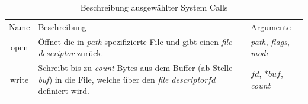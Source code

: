         \begin{table}[ht]
            \small
            \label{tab:syscall}
            \centering
            \begin{tabular}{c||p{6cm}|p{3cm}}
                \hline
                \rowcolor{Gray!36}
                \multicolumn{3}{c}{System Calls}\\
                \hline
                Name & Beschreibung & Argumente \\
                \hline
                \hline
                \rowcolor{Gray!16}
                open& Öffnet die in \textit{path} spezifizierte File und gibt einen \textit{file descriptor} zurück.& \textit{path}, \textit{flags}, \textit{mode} \\
                write& Schreibt bis zu \textit{count} Bytes aus dem Buffer (ab Stelle \textit{buf}) in die File, welche über den \textit{file descriptor}$fd$ definiert wird. & $fd$, $*buf$, \textit{count} \\
                \hline
            \end{tabular}
            \caption{Beschreibung ausgewählter System Calls}
        \end{table}

